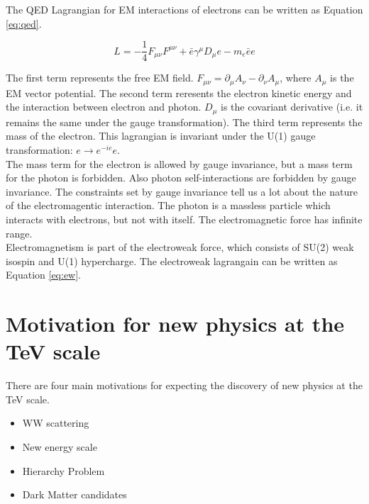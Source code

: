 The QED Lagrangian for EM interactions of electrons can be written as Equation 
\ref{eq:qed}.

\begin{equation}
L = -\frac{1}{4}F_{\mu\nu}F^{\mu\nu} + \bar{e}\gamma^{\mu}D_{\mu}e -
m_{e}\bar{e}e
\label{eq:qed}
\end{equation} 

The first term represents the free EM field. $F_{\mu\nu} = \partial_{\mu}A_{\nu}
- \partial_{\nu}A_{\mu}$, where $A_{\mu}$ is the EM vector potential. The second
 term reresents the electron kinetic energy and the interaction between electron
and photon. $D_{\mu}$ is the covariant derivative (i.e. it remains the same
under the gauge transformation). The third term represents the mass of the
electron. This lagrangian is invariant under the U(1) gauge transformation: $e
\rightarrow e^{-ie}e$. \\

The mass term for the electron is allowed by gauge invariance, but a mass term for 
the photon is forbidden. Also photon self-interactions are forbidden by gauge 
invariance. The constraints set by gauge invariance tell us a lot about the
nature of the electromagentic interaction. The photon is a massless particle which 
interacts with electrons, but not with itself. The electromagnetic force has 
infinite range. \\

Electromagnetism is part of the electroweak force, which consists of SU(2) weak
isospin and U(1) hypercharge. The electroweak lagrangain can be written as
Equation \ref{eq:ew}. \\

\begin{equation}
\end{equation}  

\section{Motivation for new physics at the TeV scale}

There are four main motivations for expecting the discovery of new physics at 
the TeV scale.

\begin{itemize}
\item WW scattering
\item New energy scale
\item Hierarchy Problem
\item Dark Matter candidates
\end{itemize}

